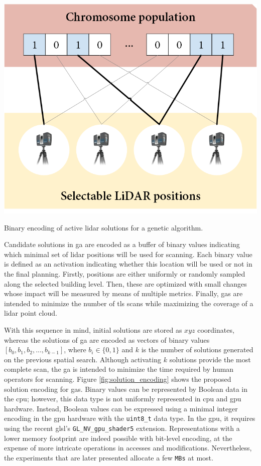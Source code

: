 \begin{marginfigure}[-1.0cm]
    \centering
    \includegraphics[width=\linewidth]{figs/lidar_optimization/solution_encoding.png}
	\caption{Binary encoding of active \acrshort{lidar} solutions for a genetic algorithm.}
	\label{fig:solution_encoding}
\end{marginfigure}
Candidate solutions in \acrshort{ga} are encoded as a buffer of binary values indicating which minimal set of \acrshort{lidar} positions will be used for scanning. Each binary value is defined as an activation indicating whether this location will be used or not in the final planning. Firstly, positions are either uniformly or randomly sampled along the selected building level. Then, these are optimized with small changes whose impact will be measured by means of multiple metrics. Finally, \acrshort{ga}s are intended to minimize the number of \acrshort{tls} scans while maximizing the coverage of a \acrshort{lidar} point cloud.

With this sequence in mind, initial solutions are stored as $xyz$ coordinates, whereas the solutions of \acrshort{ga} are encoded as vectors of binary values $[b_0, b_1, b_2, ..., b_{k-1}]$, where $b_i \in \{0, 1\}$ and $k$ is the number of solutions generated on the previous spatial search. Although activating $k$ solutions provide the most complete scan, the \acrshort{ga} is intended to minimize the time required by human operators for scanning. Figure \ref{fig:solution_encoding} shows the proposed solution encoding for \acrshort{ga}s. Binary values can be represented by Boolean data in the \acrshort{cpu}; however, this data type is not uniformly represented in \acrshort{cpu} and \acrshort{gpu} hardware. Instead, Boolean values can be expressed using a minimal integer encoding in the \acrshort{gpu} hardware with the \verb|uint8_t| data type. In the \acrshort{gpu}, it requires using the recent \acrshort{glsl}'s \verb|GL_NV_gpu_shader5| extension. Representations with a lower memory footprint are indeed possible with bit-level encoding, at the expense of more intricate operations in accesses and modifications. Nevertheless, the experiments that are later presented allocate a few \verb|MBs| at most.

